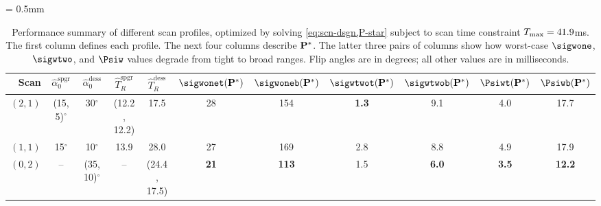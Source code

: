\begin{table*} [!tb]
	\centering
	{\tabulinesep = 0.5mm
	\begin{tabu} {r | c c c c | c c | c c | c c}
		\hline \hline 
		Scan & $\widehat{\alpha}^{\mathrm{spgr}}_0$ & $\widehat{\alpha}^{\mathrm{dess}}_0$ & $\widehat{T}_{R}^\mathrm{spgr}$ & $\widehat{T}_{R}^\mathrm{dess}$ & $\sigwonet(\bmPs)$ & $\sigwoneb(\bmPs)$ & $\sigwtwot(\bmPs)$ & $\sigwtwob(\bmPs)$ & $\Psiwt(\bmPs)$ & $\Psiwb(\bmPs)$ \\
		\hline 	
		$(2,1)$ 		& (15, 5)$^\circ$ 	& 30$^\circ$ 	
						& (12.2, 12.2) 		& 17.5 			
						& 28				& 154  				
						& \textbf{1.3}		& 9.1			 
						& 4.0				& 17.7 \\
		$(1,1)$			& 15$^\circ$		& 10$^\circ$	
						& 13.9				& 28.0
						& 27				& 169 				
						& 2.8				& 8.8			 
						& 4.9				& 17.9 \\
		$(0,2)$			& -- 				& (35, 10)$^\circ$
						& --				& (24.4, 17.5)
						& \textbf{21}		& \textbf{113} 				
						& 1.5				& \textbf{6.0}			 
						& \textbf{3.5}		& \textbf{12.2} \\
		\hline \hline
	\end{tabu}}
	\vspace{1mm}
	\caption{Performance summary of different scan profiles, optimized by solving \eqref{eq:scn-dsgn,P-star} subject to scan time constraint $T_\mathrm{max} = 41.9$ms. The first column defines each profile. The next four columns describe $\mathbf{P}^*$. The latter three pairs of columns show how worst-case $\sigwone$, $\sigwtwo$, and $\Psiw$ values degrade from tight to broad ranges. Flip angles are in degrees; all other values are in milliseconds.}
	\label{table:profile}
\end{table*} 

